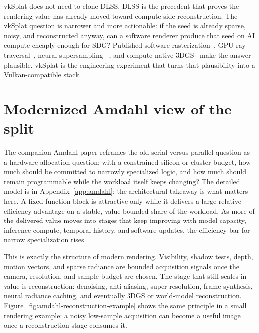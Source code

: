 \documentclass[10pt,journal]{IEEEtran}
\begin{document}
vkSplat does not need to clone DLSS. DLSS is the precedent that proves
the rendering value has already moved toward compute-side
reconstruction. The vkSplat question is narrower and more actionable:
if the seed is already sparse, noisy, and reconstructed anyway, can a
software renderer produce that seed on AI compute cheaply enough for
SDG? Published software rasterization~\cite{laine2011software}, GPU ray
traversal~\cite{aila2009understanding}, neural supersampling
~\cite{xiao2020}, and compute-native 3DGS~\cite{kerbl20233dgs} make the
answer plausible. vkSplat is the engineering experiment that turns that
plausibility into a Vulkan-compatible stack.

\section{Modernized Amdahl view of the split}
\label{sec:amdahl-main}

The companion Amdahl paper reframes the old serial-versus-parallel
question as a hardware-allocation question: with a constrained silicon
or cluster budget, how much should be committed to narrowly specialized
logic, and how much should remain programmable while the workload itself
keeps changing?  The detailed model is in
Appendix~\ref{app:amdahl}; the architectural takeaway is what matters
here.  A fixed-function block is attractive only while it delivers a
large relative efficiency advantage on a stable, value-bounded share of
the workload.  As more of the delivered value moves into stages that
keep improving with model capacity, inference compute, temporal history,
and software updates, the efficiency bar for narrow specialization rises.

This is exactly the structure of modern rendering.  Visibility, shadow
tests, depth, motion vectors, and sparse radiance are bounded acquisition
signals once the camera, resolution, and sample budget are chosen.  The
stage that still scales in value is reconstruction: denoising,
anti-aliasing, super-resolution, frame synthesis, neural radiance
caching, and eventually 3DGS or world-model reconstruction.
Figure~\ref{fig:amdahl-reconstruction-example} shows the same principle in a
small rendering example: a noisy low-sample acquisition can become a
useful image once a reconstruction stage consumes it.
\end{document}
